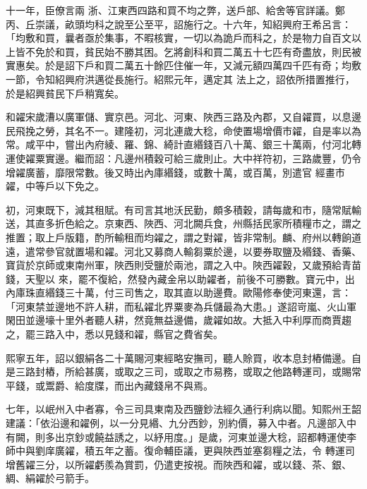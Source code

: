 \begin{pinyinscope}
 十一年，臣僚言兩
 浙、江東西四路和買不均之弊，送戶部、給舍等官詳議。鄭丙、丘崇議，畝頭均科之說至公至平，詔施行之。十六年，知紹興府王希呂言：「均敷和買，曩者亟於集事，不暇核實，一切以為詭戶而科之，於是物力自百文以上皆不免於和買，貧民始不勝其困。乞將創科和買二萬五十七匹有奇盡放，則民被實惠矣。於是詔下戶和買二萬五十餘匹住催一年，又減元額四萬四千匹有奇；均敷一節，令知紹興府洪邁從長施行。紹熙元年，邁定其
 法上之，詔依所措置推行，於是紹興貧民下戶稍寬矣。



 和糴宋歲漕以廣軍儲、實京邑。河北、河東、陜西三路及內郡，又自糴買，以息邊民飛挽之勞，其名不一。建隆初，河北連歲大稔，命使置場增價市糴，自是率以為常。咸平中，嘗出內府綾、羅、錦、綺計直緡錢百八十萬、銀三十萬兩，付河北轉運使糴粟實邊。繼而詔：凡邊州積穀可給三歲則止。大中祥符初，三路歲豐，仍令增糴廣蓄，靡限常數。後又時出內庫緡錢，或數十萬，或百萬，別遣官
 經畫市糴，中等戶以下免之。



 初，河東既下，減其租賦。有司言其地沃民勤，頗多積穀，請每歲和市，隨常賦輸送，其直多折色給之。京東西、陜西、河北闕兵食，州縣括民家所積糧市之，謂之推置；取上戶版籍，酌所輸租而均糴之，謂之對糴，皆非常制。麟、府州以轉餉道遠，遣常參官就置場和糴。河北又募商人輸芻粟於邊，以要券取鹽及緡錢、香藥、寶貨於京師或東南州軍，陜西則受鹽於兩池，謂之入中。陜西糴穀，又歲預給青苗錢，天聖以
 來，罷不復給，然發內藏金帛以助糴者，前後不可勝數。寶元中，出內庫珠直緡錢三十萬，付三司售之，取其直以助邊費。歐陽修奉使河東還，言：「河東禁並邊地不許人耕，而私糴北界粟麥為兵儲最為大患。」遂詔岢嵐、火山軍閑田並邊壕十里外者聽人耕，然竟無益邊備，歲糴如故。大抵入中利厚而商賈趨之，罷三路入中，悉以見錢和糴，縣官之費省矣。



 熙寧五年，詔以銀絹各二十萬賜河東經略安撫司，聽人賒買，收本息封樁備邊。自
 是三路封樁，所給甚廣，或取之三司，或取之市易務，或取之他路轉運司，或賜常平錢，或鬻爵、給度牒，而出內藏錢帛不與焉。



 七年，以岷州入中者寡，令三司具東南及西鹽鈔法經久通行利病以聞。知熙州王韶建議：「依沿邊和糴例，以一分見緡、九分西鈔，別約價，募入中者。凡邊部入中有闕，則多出京鈔或饒益誘之，以紓用度。」是歲，河東並邊大稔，詔都轉運使李師中與劉庠廣糴，積五年之蓄。復命輔臣議，更與陜西並塞芻糧之法，令
 轉運司增舊糴三分，以所糴虧羨為賞罰，仍遣吏按視。而陜西和糴，或以錢、茶、銀、綢、絹糴於弓箭手。




\end{pinyinscope}

